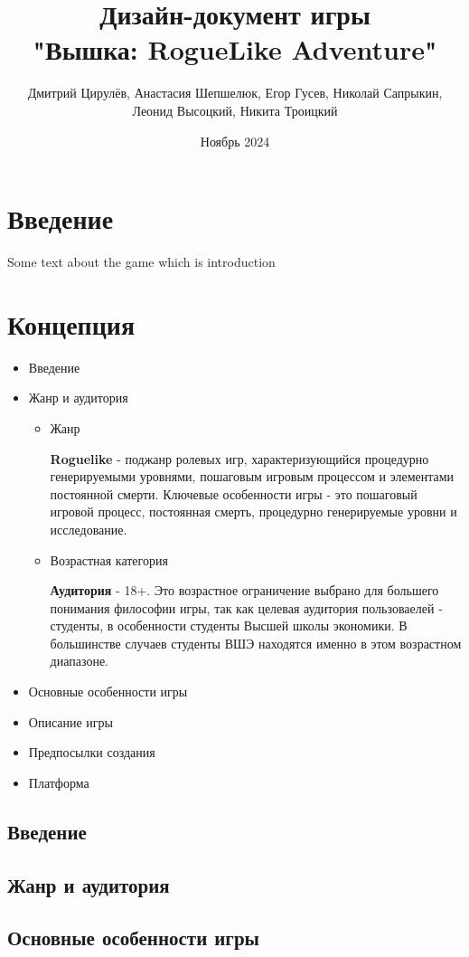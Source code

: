 \documentclass{article}
\title{Дизайн-документ игры \\"Вышка: RogueLike Adventure"}
\author{Дмитрий Цирулёв, Анастасия Шепшелюк, Егор Гусев, Николай Сапрыкин, Леонид Высоцкий, Никита Троицкий }
\date{Ноябрь 2024}
\begin{document}
\maketitle

\tableofcontents
\newpage
\section{Введение}
Some text about the game which is introduction
\newpage
\section{Концепция}
\begin{itemize}
    \item Введение
    \item Жанр и аудитория
    \begin{itemize}
        \item Жанр \par
        \textbf{Roguelike} - поджанр ролевых игр, характеризующийся процедурно генерируемыми уровнями, пошаговым игровым процессом и элементами постоянной смерти. Ключевые особенности игры - это пошаговый игровой процесс, постоянная смерть, процедурно генерируемые уровни и исследование. 
        \item Возрастная категория \par
        \textbf{Аудитория} - 18+. Это возрастное ограничение выбрано для большего понимания философии игры, так как целевая аудитория пользоваелей - студенты, в особенности студенты Высшей школы экономики. В большинстве случаев студенты ВШЭ находятся именно в этом возрастном диапазоне.
    \end{itemize}
    \item Основные особенности игры
    \item Описание игры
    \item Предпосылки создания
    \item Платформа
\end{itemize}
\subsection{Введение}

\subsection{Жанр и аудитория}

\subsection{Основные особенности игры}
\end{document}
